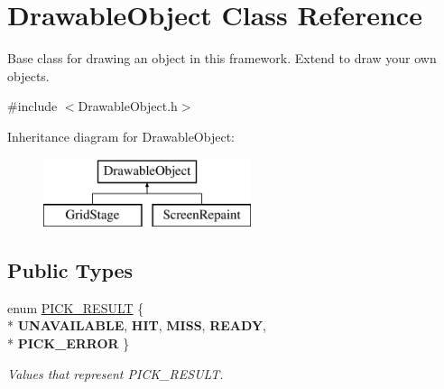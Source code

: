 \hypertarget{class_drawable_object}{\section{Drawable\-Object Class Reference}
\label{class_drawable_object}
}


Base class for drawing an object in this framework. Extend to draw your own objects.  




{\ttfamily \#include $<$Drawable\-Object.\-h$>$}

Inheritance diagram for Drawable\-Object\-:\begin{figure}[H]
\begin{center}
\leavevmode
\includegraphics[height=2.000000cm]{class_drawable_object}
\end{center}
\end{figure}
\subsection*{Public Types}
\begin{DoxyCompactItemize}
\item 
enum \hyperlink{class_drawable_object_aa5a991e086b6d0a74bd538d69570da93}{P\-I\-C\-K\-\_\-\-R\-E\-S\-U\-L\-T} \{ \\*
{\bfseries U\-N\-A\-V\-A\-I\-L\-A\-B\-L\-E}, 
{\bfseries H\-I\-T}, 
{\bfseries M\-I\-S\-S}, 
{\bfseries R\-E\-A\-D\-Y}, 
\\*
{\bfseries P\-I\-C\-K\-\_\-\-E\-R\-R\-O\-R}
 \}
\begin{DoxyCompactList}\small\item\em Values that represent P\-I\-C\-K\-\_\-\-R\-E\-S\-U\-L\-T. \end{DoxyCompactList}\end{DoxyCompactItemize}
